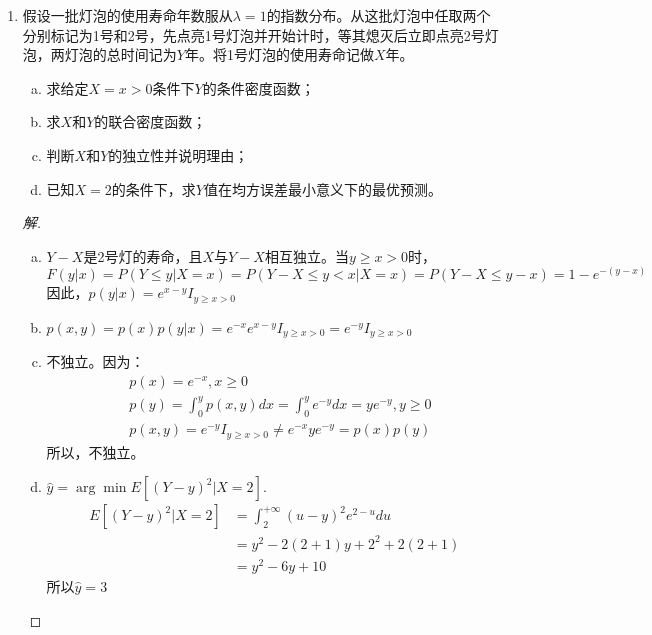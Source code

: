 \documentclass[12pt]{article}
\newcommand{\hei}{\CJKfamily{hei}}                          %
\begin{document}
\begin{enumerate}
\item {\hei 假设一批灯泡的使用寿命年数服从$\lambda=1$的指数分布。从这批灯泡中任取两个分别标记为1号和2号，先点亮1号灯泡并开始计时，等其熄灭后立即点亮2号灯泡，两灯泡的总时间记为$Y$年。将1号灯泡的使用寿命记做$X$年。
\begin{enumerate}[(a)]
	\item 求给定$X=x>0$条件下$Y$的条件密度函数；
	\item 求$X$和$Y$的联合密度函数；
	\item 判断$X$和$Y$的独立性并说明理由；
	\item 已知$X=2$的条件下，求$Y$值在均方误差最小意义下的最优预测。
\end{enumerate}}
\begin{proof}[解]
	\begin{enumerate}[(a)]
		\item $Y-X$是2号灯的寿命，且$X$与$Y-X$相互独立。当$y\ge x >0$时，
		\begin{equation*}
		F(y|x)=P(Y\le y|X=x)=P(Y-X\le y<x|X=x)=P(Y-X\le y-x)=1-e^{-(y-x)}
		\end{equation*}
		因此，$p(y|x)=e^{x-y} I_{y\ge x>0}$
		\item $p(x,y)=p(x)p(y|x)=e^{-x}e^{x-y}I_{y\ge x>0}=e^{-y}I_{y\ge x>0}$
		\item 不独立。因为：
		\begin{equation*}
		\begin{aligned}
		&p(x)=e^{-x},x\ge 0\\
		&p(y)=\int_{0}^yp(x,y)dx=\int_{0}^{y}e^{-y}dx=ye^{-y},y\ge 0 \\
		&p(x,y)=e^{-y}I_{y\ge x>0}\ne e^{-x}ye^{-y}=p(x)p(y)
		\end{aligned}
		\end{equation*}
		所以，不独立。
		\item $\hat{y}=\arg\min E[(Y-y)^2|X=2]$.
		\begin{equation*}
		\begin{aligned}
		E[(Y-y)^2|X=2]&=\int_{2}^{+\infty}(u-y)^2e^{2-u}du \\
		&=y^2-2(2+1)y+2^2+2(2+1) \\
		&=y^2-6y+10
		\end{aligned}
		\end{equation*}
		所以$\hat{y}=3$
	\end{enumerate}
\end{proof}



\end{enumerate}
\end{document}
